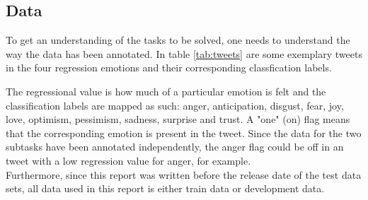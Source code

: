 \subsection{Data} \label{sec:introdata}
To get an understanding of the tasks to be solved, one needs to understand the way the data has been annotated. In table \ref{tab:tweets} are some exemplary tweets in the four regression emotions and their corresponding classfication labels.\\
\begin{table}[H]
\caption{Exemplary tweets with regression and clasification labels}
\label{tab:tweets}
\end{table}
The regressional value is how much of a particular emotion is felt and the classification labels are mapped as such: anger, anticipation, disgust, fear, joy, love, optimism, pessimism, sadness, surprise and trust. A "one" (on) flag means that the corresponding emotion is present in the tweet. Since the data for the two subtasks have been annotated independently, the anger flag could be off in an tweet with a low regression value for anger, for example. \\
Furthermore, since this report was written before the release date of the test data sets, all data used in this report is either train data or development data.